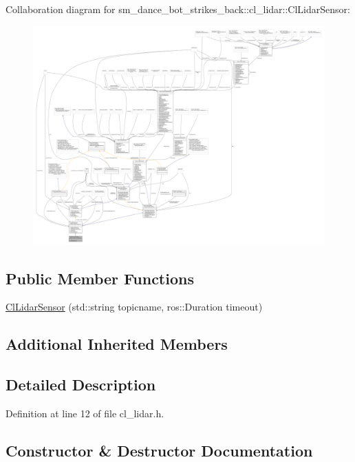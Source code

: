 Collaboration diagram for sm\+\_\+dance\+\_\+bot\+\_\+strikes\+\_\+back\+:\+:cl\+\_\+lidar\+:\+:Cl\+Lidar\+Sensor\+:
\nopagebreak
\begin{figure}[H]
\begin{center}
\leavevmode
\includegraphics[width=350pt]{classsm__dance__bot__strikes__back_1_1cl__lidar_1_1ClLidarSensor__coll__graph}
\end{center}
\end{figure}
\subsection*{Public Member Functions}
\begin{DoxyCompactItemize}
\item 
\hyperlink{classsm__dance__bot__strikes__back_1_1cl__lidar_1_1ClLidarSensor_a0e1099380f5ec3d8643f68671c9ffaa0}{Cl\+Lidar\+Sensor} (std\+::string topicname, ros\+::\+Duration timeout)
\end{DoxyCompactItemize}
\subsection*{Additional Inherited Members}


\subsection{Detailed Description}


Definition at line 12 of file cl\+\_\+lidar.\+h.



\subsection{Constructor \& Destructor Documentation}
\mbox{\label{classsm__dance__bot__strikes__back_1_1cl__lidar_1_1ClLidarSensor_a0e1099380f5ec3d8643f68671c9ffaa0}} 
